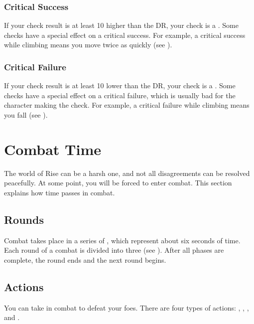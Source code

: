         \subsubsection{Critical Success}
            If your check result is at least 10 higher than the DR, your check is a .
            Some checks have a special effect on a critical success.
            For example, a critical success while climbing means you move twice as quickly (see ).

        \subsubsection{Critical Failure}
            If your check result is at least 10 lower than the DR, your check is a .
            Some checks have a special effect on a critical failure, which is usually bad for the character making the check.
            For example, a critical failure while climbing means you fall (see ).

\section{Combat Time}\label{Combat Time}
    The world of Rise can be a harsh one, and not all disagreements can be resolved peacefully.
    At some point, you will be forced to enter combat.
    This section explains how time passes in combat.

    \subsection{Rounds}\label{Rounds}

        Combat takes place in a series of , which represent about six seconds of time.
        Each round of a combat is divided into three  (see ).
        After all phases are complete, the round ends and the next round begins.

    \subsection{Actions}\label{Actions}

        You can take  in combat to defeat your foes.
        There are four types of actions: , , , and .

